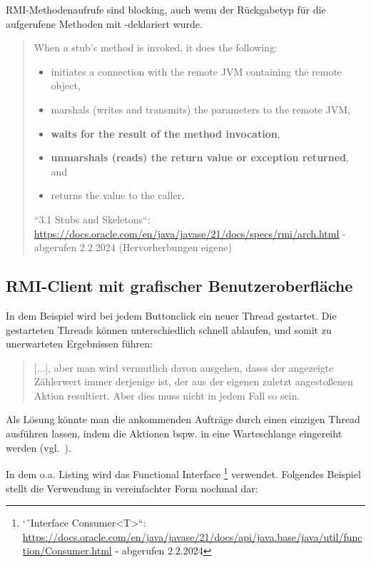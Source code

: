 \begin{tcolorbox}
    RMI-Methodenaufrufe sind blocking, auch wenn der Rückgabetyp für die aufgerufene Methoden mit -deklariert wurde.\\

    \blockquote[{``3.1 Stubs and Skeletons``: \url{https://docs.oracle.com/en/java/javase/21/docs/specs/rmi/arch.html} - abgerufen 2.2.2024 (Hervorherbungen eigene)}]{
        When a stub's method is invoked, it does the following:
        \begin{itemize}
            \item initiates a connection with the remote JVM containing the remote object,
            \item marshals (writes and transmits) the parameters to the remote JVM,
            \item \textbf{waits for the result of the method invocation},
            \item \textbf{unmarshals (reads) the return value or exception returned}, and
            \item returns the value to the caller.
        \end{itemize}

    }
\end{tcolorbox}

\subsection{RMI-Client mit grafischer Benutzeroberfläche}

In dem Beispiel \cite[320, Listing 6.5]{Oec22} wird bei jedem Buttonclick ein neuer Thread gestartet.
Die gestarteten Threads können unterschiedlich schnell ablaufen, und somit zu unerwarteten Ergebnissen führen:

\blockquote[{\cite[323]{Oec22}}]{
[...], aber man wird vermutlich davon ausgehen, dasss der angezeigte Zählerwert immer derjenige ist, der aus der eigenen zuletzt angestoßenen Aktion resultiert.
    Aber dies muss nicht in jedem Fall so sein.
}

Als Lösung könnte man die ankommenden Aufträge durch einen einzigen Thread ausführen lassen, indem die Aktionen {bspw.} in eine Warteschlange eingereiht werden (vgl.~\cite[323]{Oec22}).

\newpage
In dem o.a. Listing wird das Functional Interface \footnote{
`´Interface Consumer<T>``: \url{https://docs.oracle.com/en/java/javase/21/docs/api/java.base/java/util/function/Consumer.html} - abgerufen 2.2.2024
} verwendet.
Folgendes Beispiel stellt die Verwendung in vereinfachter Form nochmal dar:


